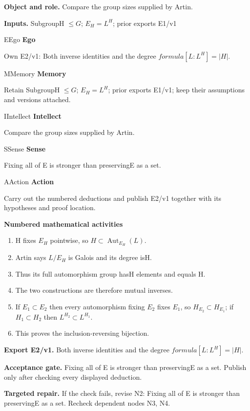 \documentclass[preprint,12pt,aps,pra,showkeys,amsmath,amssymb,superscriptaddress,floatfix]{revtex4-2}
\theoremstyle{definition}
\theoremstyle{remark}
\newcommand{\mmfaculty}[3]{%
 \begin{mmfacultybox}{#1}{#2}
 {\sffamily\bfseries\color{MMBlue}#2}\par\smallskip #3
 \end{mmfacultybox}}
\newcommand{\field}[2]{\par\smallskip\noindent\textbf{#1.} #2\par}
\begin{document}
\field{Object and role}{Compare the group sizes supplied by Artin.}

\field{Inputs}{SubgroupH \(\le G\); \(E_H=L^H\); prior exports E1/v1}

\mmfaculty{E}{Ego}{Own E2/v1: Both inverse identities and the degree
\(formula[L:L^H]=|H|\).}

\mmfaculty{M}{Memory}{Retain SubgroupH \(\le G\); \(E_H=L^H\); prior exports E1/v1; keep their
assumptions and versions attached.}

\mmfaculty{I}{Intellect}{Compare the group sizes supplied by Artin.}

\mmfaculty{S}{Sense}{Fixing all of E is stronger than preservingE as a set.}

\mmfaculty{A}{Action}{Carry out the numbered deductions and publish E2/v1 together with its
hypotheses and proof location.}

\smallskip\noindent\textbf{Numbered mathematical activities}

\begin{enumerate}[label=N2.\arabic*,leftmargin=3.4em]

\item H fixes \(E_H\) pointwise, so \(H\subset \operatorname{Aut} _{E_H}(L)\).

\item Artin says \(L/E_H\) is Galois and its degree is\textbar H\textbar.

\item Thus its full automorphism group has\textbar H\textbar{} elements and
equals H.

\item The two constructions are therefore mutual inverses.

\item If \(E_{1}\subset E_{2}\) then every automorphism fixing \(E_{2}\) fixes
\(E_{1}\), so \(H_{E_{2}}\subset H_{E_{1}}\); if \(H_{1}\subset H_{2}\)
then \(L^{H_{2}}\subset L^{H_{1}}\).

\item This proves the inclusion-reversing bijection.

\end{enumerate}

\field{Export E2/v1}{Both inverse identities and the degree \(formula[L:L^H]=|H|\).}

\field{Acceptance gate}{Fixing all of E is stronger than preservingE as a set. Publish only
after checking every displayed deduction.}

\field{Targeted repair}{If the check fails, revise N2: Fixing all of E is stronger than
preservingE as a set. Recheck dependent nodes N3, N4.}
\end{document}
